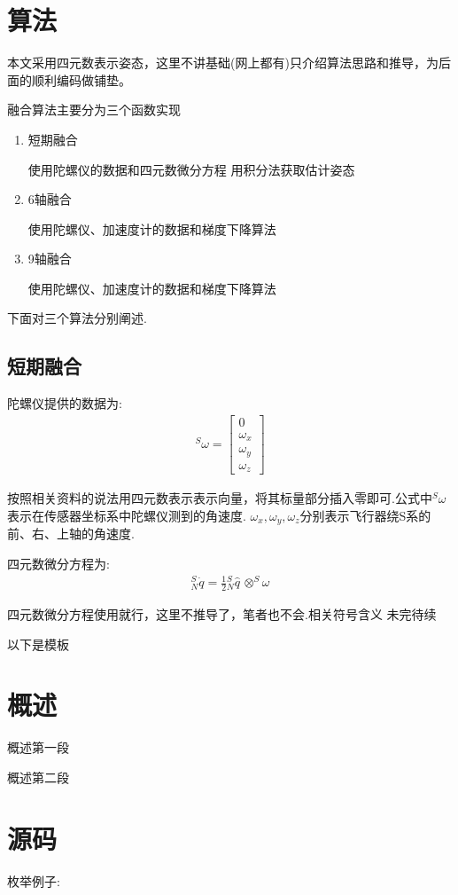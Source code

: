 \documentclass[12pt,a4paper]{article}
\begin{document}
\section{算法}
本文采用四元数表示姿态，这里不讲基础(网上都有)只介绍算法思路和推导，为后面的顺利编码做铺垫。

融合算法主要分为三个函数实现
\begin{enumerate}
    \item 短期融合

        使用陀螺仪的数据和四元数微分方程 用积分法获取估计姿态
    \item 6轴融合

        使用陀螺仪、加速度计的数据和梯度下降算法
    \item 9轴融合

        使用陀螺仪、加速度计的数据和梯度下降算法
\end{enumerate}
下面对三个算法分别阐述.

\subsection{短期融合}
陀螺仪提供的数据为:
\begin{eqnarray}
^S\omega
=
\left[\begin{array}{c} 
    0 \\
    \omega_{x} \\
    \omega_{y} \\
    \omega_{z}
\end{array}
\right]
\end{eqnarray}

按照相关资料的说法用四元数表示表示向量，将其标量部分插入零即可.公式中$^S\omega$表示在传感器坐标系中陀螺仪测到的角速度.
$\omega_{x},\omega_{y},\omega_{z}$分别表示飞行器绕S系的前、右、上轴的角速度.

四元数微分方程为:
\begin{eqnarray}
    ^S_N\dot{q}=\frac{1}{2}{^S_N\hat{q}}\,\otimes^S\omega
\end{eqnarray}

四元数微分方程使用就行，这里不推导了，笔者也不会.相关符号含义 未完待续

\newpage
以下是模板
\section{概述}
概述第一段

概述第二段
\section{源码} 
枚举例子:
\end{document}
